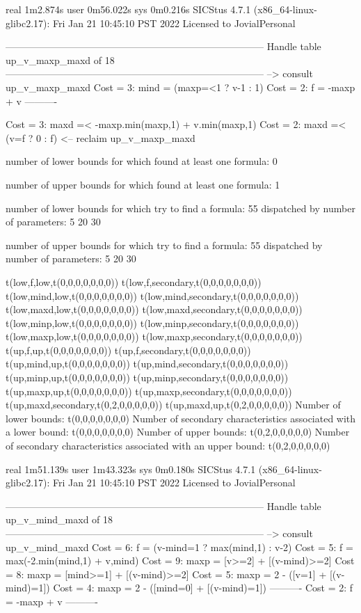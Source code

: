 real	1m2.874s
user	0m56.022s
sys	0m0.216s
SICStus 4.7.1 (x86_64-linux-glibc2.17): Fri Jan 21 10:45:10 PST 2022
Licensed to JovialPersonal


--------------------------------------------------------------------------------
Handle table up_v_maxp_maxd of 18
--------------------------------------------------------------------------------
--> consult up_v_maxp_maxd
Cost =  3:  mind = (maxp=<1 ? v-1 : 1)
Cost =  2:  f    = -maxp + v
----------

Cost =  3:  maxd =< -maxp.min(maxp,1) + v.min(maxp,1)
Cost =  2:  maxd =< (v=f ? 0 : f)
<-- reclaim up_v_maxp_maxd

number of lower bounds for which found at least one formula: 0

number of upper bounds for which found at least one formula: 1

number of lower bounds for which try to find a formula: 55
dispatched by number of parameters: 5  20  30

number of upper bounds for which try to find a formula: 55
dispatched by number of parameters: 5  20  30

t(low,f,low,t(0,0,0,0,0,0,0))
t(low,f,secondary,t(0,0,0,0,0,0,0))
t(low,mind,low,t(0,0,0,0,0,0,0))
t(low,mind,secondary,t(0,0,0,0,0,0,0))
t(low,maxd,low,t(0,0,0,0,0,0,0))
t(low,maxd,secondary,t(0,0,0,0,0,0,0))
t(low,minp,low,t(0,0,0,0,0,0,0))
t(low,minp,secondary,t(0,0,0,0,0,0,0))
t(low,maxp,low,t(0,0,0,0,0,0,0))
t(low,maxp,secondary,t(0,0,0,0,0,0,0))
t(up,f,up,t(0,0,0,0,0,0,0))
t(up,f,secondary,t(0,0,0,0,0,0,0))
t(up,mind,up,t(0,0,0,0,0,0,0))
t(up,mind,secondary,t(0,0,0,0,0,0,0))
t(up,minp,up,t(0,0,0,0,0,0,0))
t(up,minp,secondary,t(0,0,0,0,0,0,0))
t(up,maxp,up,t(0,0,0,0,0,0,0))
t(up,maxp,secondary,t(0,0,0,0,0,0,0))
t(up,maxd,secondary,t(0,2,0,0,0,0,0))
t(up,maxd,up,t(0,2,0,0,0,0,0))
Number of lower bounds:                                             t(0,0,0,0,0,0,0)
Number of secondary characteristics associated with a lower bound:  t(0,0,0,0,0,0,0)
Number of upper bounds:                                             t(0,2,0,0,0,0,0)
Number of secondary characteristics associated with an upper bound: t(0,2,0,0,0,0,0)

real	1m51.139s
user	1m43.323s
sys	0m0.180s
SICStus 4.7.1 (x86_64-linux-glibc2.17): Fri Jan 21 10:45:10 PST 2022
Licensed to JovialPersonal


--------------------------------------------------------------------------------
Handle table up_v_mind_maxd of 18
--------------------------------------------------------------------------------
--> consult up_v_mind_maxd
Cost =  6:  f    = (v-mind=1 ? max(mind,1) : v-2)
Cost =  5:  f    = max(-2.min(mind,1) + v,mind)
Cost =  9:  maxp = [v>=2] + [(v-mind)>=2]
Cost =  8:  maxp = [mind>=1] + [(v-mind)>=2]
Cost =  5:  maxp = 2 - ([v=1] + [(v-mind)=1])
Cost =  4:  maxp = 2 - ([mind=0] + [(v-mind)=1])
----------
Cost =  2:  f    = -maxp + v
----------

